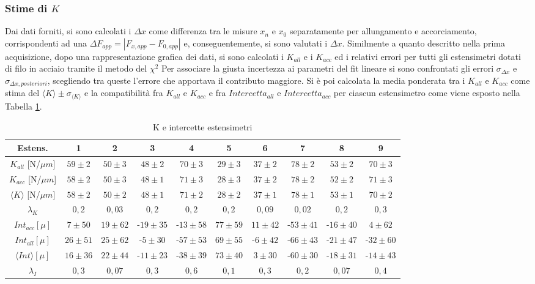 \documentclass[a4paper,11pt,oneside]{article}
\begin{document}
\subsubsection*{Stime di $K$}
Dai dati forniti, si sono calcolati i $\Delta x$ come differenza tra le misure $x_n$ e $x_0$ separatamente per allungamento e accorciamento, corrispondenti ad una $\Delta F_{app} =\left | F_{x, app} - F_{0, app} \right |$ e, conseguentemente, si sono valutati i $\Delta x$.
Similmente a quanto descritto nella prima acquisizione, dopo una rappresentazione grafica dei dati, si sono calcolati i $K_{all}$ e i $K_{acc}$ ed i relativi errori per tutti gli estensimetri dotati di filo in acciaio tramite il metodo del $\chi^2$
Per associare la giusta incertezza ai parametri del fit lineare si sono confrontati gli errori $\sigma_{\Delta x}$ e $\sigma_{\Delta x, posteriori}$, scegliendo tra queste l'errore che apportava il contributo maggiore.
Si è poi calcolata la media ponderata tra i $K_{all}$ e $K_{acc}$ come stima del ${\langle K \rangle }\pm \sigma_{{\langle K\rangle }}$ e la compatibilità fra $K_{all}$ e $K_{acc}$ e fra $Intercetta_{all}$ e $Intercetta_{acc}$ per ciascun estensimetro come viene esposto nella Tabella \ref{tab:K_est}.

\begin{table}[h!]
    \begin{center}
    \begin{tabular}{|c|c|c|c|c|c|c|c|c|c|}
        \hline
        Estens. &  1&    2&	3&	4&	5&	6&	7&	8&	9\\ \hline
        $K_{all}$	[N/$\mu m$]&	$59\pm2$&	$50\pm3$&	$48\pm2$&	$70\pm3$&	$29\pm3$&	$37\pm2$&	$78\pm2$&	$53\pm2$&	$70\pm3$\\
        $K_{acc}$	[N/$\mu m$]&	$58\pm2$&	$50\pm3$&	$48\pm1$&	$71\pm3$&	$28\pm3$&	$37\pm2$&	$78\pm2$&	$52\pm2$&	$71\pm3$\\
        $\langle K\rangle$ [N/$\mu m$]&	$58\pm2$&	$50\pm2$&	$48\pm1$&	$71\pm2$&	$28\pm2$&	$37\pm1$&	$78\pm1$&	$53\pm1$&   $70\pm2$\\
        $\lambda_K$& $0,2$&	$0,03$&	$0,2$& $0,2$&	$0,2$&	$0,09$&	$0,02$&	$0,2$&	$0,3$ \\
        \hline
        $Int_{acc}   [\mu]$&	$7\pm50$&	$19\pm62$&	-$19\pm35$&	-$13\pm58$&    $77\pm59$&	$11\pm42$&	-$53\pm41$&	-$16\pm40$&	$4\pm62$\\
        $Int_{all}	[\mu]$ &  $26\pm 51$&	$25\pm 62$&	-$5\pm30$&	-$57 \pm53$&	$69\pm55$&	-$6\pm42$&	-$66\pm43$&	-$21\pm47$&	-$32\pm60$\\
        $\langle Int\rangle [\mu]$&	$16\pm36$&	$22\pm44$&	-$11\pm23$&	-$38 \pm39$&	$73\pm40$&	$3\pm30$&	-$60\pm30$&	-$18\pm31$&	-$14\pm43$\\
        $\lambda_I$&    $0,3$&	$0,07$&	$0,3$&	$0,6$&	$0,1$&	$0,3$&	$0,2$&	$0,07$&	$0,4$\\
        \hline
    \end{tabular}
    \caption{K e intercette estensimetri}
    \label{tab:K_est}
    \end{center}
\end{table}{}
\end{document}
